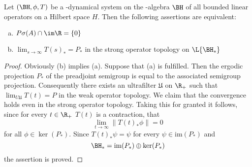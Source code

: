 \begin{proposition}\label{prop:d4-3.7}
Let $ (\BH,\phi,T) $  be a \WA-dynamical system on the \WA-algebra $ \BH $  of all bounded linear operators on a Hilbert space $ H $.
Then the following assertions are equivalent:
\begin{enumerate}[(a)]
\item
$ P\sigma(A) \cap \im\R = \{0\} $ 

\item
$ \lim_{s \to \infty} T(s)_{*} = P_{*} $  in the strong operator topology on $ \L{\BH_{*}} $ 
\end{enumerate}
\end{proposition}

\begin{proof}
Obviously (b) implies (a).
Suppose that (a) is fulfilled.
Then the ergodic projection $ P_{*} $  of the preadjoint semigroup is equal to the associated semigroup projection.
Consequently there exists an ultrafilter $ \mathfrak{U} $  on $ \R_{+} $  such that $ \lim_{U\mathfrak{U}} T(t) = P $  in the weak operator topology.
We claim that the convergence holds even in the strong operator topology.
Taking this for granted it follows, since for every $ t \in \R_{+} $  $ T(t) $  is a contraction, that
\[
\lim_{t \to \infty} \|T(t)_{*}\phi\| = 0
\]
for all $ \phi \in \ker(P_{*}) $.
Since $ T(t)_{*}\psi = \psi $  for every $ \psi \in \text{im}(P_{*}) $  and
\[
\BH_{*} = \text{im}(P_{*}) \oplus \ker(P_{*})
\]
the assertion is proved.


\end{proof}
